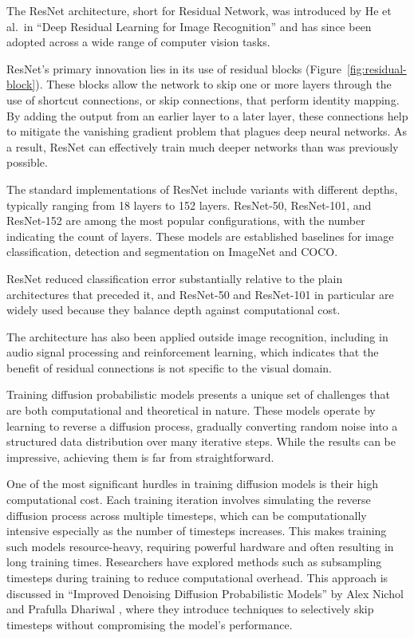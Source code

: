 The ResNet architecture, short for Residual Network, was introduced by He et al.\ in ``Deep Residual
Learning for Image Recognition'' \parencite{arXiv:1512.03385} and has since been adopted across a
wide range of computer vision tasks.

ResNet’s primary innovation lies in its use of residual blocks (Figure~\ref{fig:residual-block}).
These blocks allow the network to skip one or more layers through the use of shortcut connections,
or skip connections, that perform identity mapping. By adding the output from an earlier layer to a
later layer, these connections help to mitigate the vanishing gradient problem that plagues deep
neural networks. As a result, ResNet can effectively train much deeper networks than was previously
possible.

The standard implementations of ResNet include variants with different depths, typically ranging
from 18 layers to 152 layers. ResNet-50, ResNet-101, and ResNet-152 are among the most popular
configurations, with the number indicating the count of layers. These models are established
baselines for image classification, detection and segmentation on ImageNet and COCO.

ResNet reduced classification error substantially relative to the plain architectures that preceded
it, and ResNet-50 and ResNet-101 in particular are widely used because they balance depth against
computational cost.

The architecture has also been applied outside image recognition, including in audio signal
processing and reinforcement learning, which indicates that the benefit of residual connections is
not specific to the visual domain.

Training diffusion probabilistic models presents a unique set of challenges that are both
computational and theoretical in nature. These models operate by learning to reverse a diffusion
process, gradually converting random noise into a structured data distribution over many iterative
steps. While the results can be impressive, achieving them is far from straightforward.

One of the most significant hurdles in training diffusion models is their high computational cost.
Each training iteration involves simulating the reverse diffusion process across multiple timesteps,
which can be computationally intensive especially as the number of timesteps increases. This makes
training such models resource-heavy, requiring powerful hardware and often resulting in long
training times. Researchers have explored methods such as subsampling timesteps during training to
reduce computational overhead. This approach is discussed in ``Improved Denoising Diffusion
Probabilistic Models'' by Alex Nichol and Prafulla Dhariwal \cite{arXiv:2102.09672}, where they
introduce techniques to selectively skip timesteps without compromising the model’s performance.

